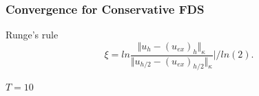 \documentclass{beamer}
\begin{document}
\begin{frame}
\frametitle{Convergence for Conservative FDS}
Runge's rule
\begin{equation}\label{Runge}
\xi = ln  \frac{\Vert u_{h} - (u_{ex})_{h} \Vert_\kappa } {\Vert  u_{h/2} - (u_{ex})_{h/2} \Vert_\kappa  } | / ln(2).
\end{equation}

$T = 10$
\begin{table}[ht]
\centering
\small
		\caption{Space convergence speed for the solution obtained by the Conservative FDS with zero boundary conditions and approximation errors $O(h^{2})$. Errors $\Vert u_{h} - (u_{ex})_{h} \Vert$ are measured in $L_2$ and $L_\infty$ norms}
\label{tableC}
\end{table}

\end{frame}


\end{document}
